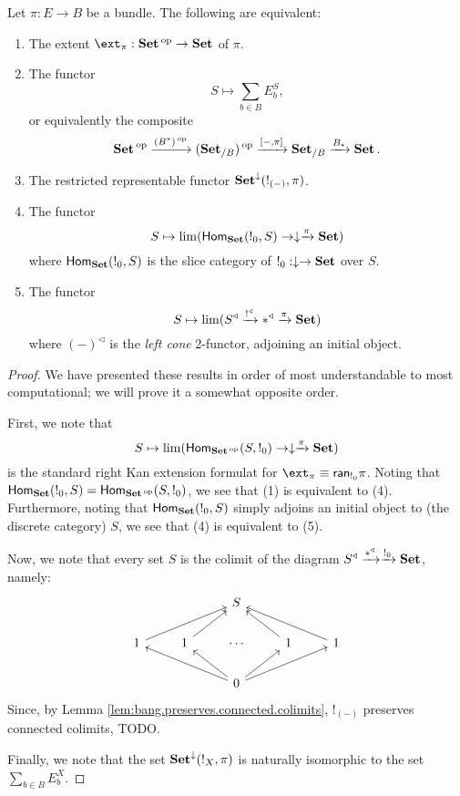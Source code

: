 \begin{prop}\label{prop:set.characterizing.extent}
  Let $\pi : E \to B$ be a bundle. The following are equivalent:
  \begin{enumerate}
  \item The extent $\ext_{\pi} : \Set\op \to \Set$ of $\pi$.
  \item The functor
    $$S \mapsto \sum_{b \in B} E_b^S,$$
    or equivalently the composite
  $$\operatorname{\textbf{Set}}\operatorname{^\text{op}} \xrightarrow{(B^{\ast})\operatorname{^\text{op}}} (\operatorname{\textbf{Set}}_{/B})\operatorname{^\text{op}} \xrightarrow{[-, \pi]} \operatorname{\textbf{Set}}_{/B}
  \xrightarrow{B_{\ast}} \operatorname{\textbf{Set}}.$$
\item The restricted representable functor
  $\operatorname{\textbf{Set}}^{\downarrow}(!_{(-)}, \pi)$.
\item The functor
  $$S \mapsto \lim(\operatorname{\mathsf{Hom}}_{\operatorname{\textbf{Set}}}(!_0, S) \to \downarrow \xrightarrow{\pi} \operatorname{\textbf{Set}})$$
  where $\operatorname{\mathsf{Hom}}_{\operatorname{\textbf{Set}}}(!_0, S)$ is the slice category of $!_0 : \downarrow \to
  \operatorname{\textbf{Set}}$ over $S$.
\item The functor
  $$S \mapsto \lim(S^{\triangleleft} \xrightarrow{!^{\triangleleft}} \ast^{\triangleleft}
  \xrightarrow{\pi} \operatorname{\textbf{Set}})$$
  where $(-)^{\triangleleft}$ is the \emph{left cone} 2-functor, adjoining an initial object.
  \end{enumerate}
\end{prop}
\begin{proof}
We have presented these results in order of most understandable to most
computational; we will prove it a somewhat opposite order.

First, we note that 
$$S \mapsto \lim(\operatorname{\mathsf{Hom}}_{\operatorname{\textbf{Set}}\operatorname{^\text{op}}}(S, !_0) \to \downarrow \xrightarrow{\pi} \operatorname{\textbf{Set}})$$
is the standard right Kan extension formulat for $\ext_{\pi} \equiv
\term{ran}_{!_0} \pi$. Noting that $\operatorname{\mathsf{Hom}}_{\operatorname{\textbf{Set}}}(!_0, S) = \operatorname{\mathsf{Hom}}_{\operatorname{\textbf{Set}}\operatorname{^\text{op}}}(S,
!_0)$, we see that (1) is equivalent to (4). Furthermore, noting that
$\operatorname{\mathsf{Hom}}_{\operatorname{\textbf{Set}}}(!_0, S)$ simply adjoins an initial object to (the discrete
category) $S$, we see that (4) is equivalent to (5).

Now, we note that every set $S$ is the colimit of the diagram $S^{\triangleleft}
\xrightarrow{\ast^{\triangleleft}} \xrightarrow{!_0} \operatorname{\textbf{Set}}$, namely:
\[
\begin{tikzcd}
              &              & S                                               &              &               \\
1 \arrow[rru] & 1 \arrow[ru] & \cdots                                          & 1 \arrow[lu] & 1 \arrow[llu] \\
              &              & 0 \arrow[llu] \arrow[lu] \arrow[ru] \arrow[rru] &              &              
\end{tikzcd}
\]
Since, by Lemma \ref{lem:bang.preserves.connected.colimits}, $!_{(-)}$
preserves connected colimits, {\color{red} TODO}.

Finally, we note that the set $\operatorname{\textbf{Set}}^{\downarrow}(!_X, \pi)$ is naturally
isomorphic to the set $\sum_{b \in B} E_b^X$.
\end{proof}

